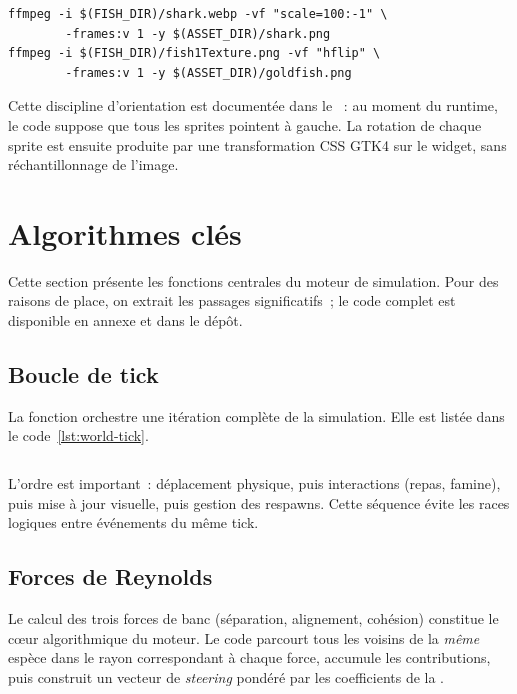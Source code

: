 \begin{verbatim}
ffmpeg -i $(FISH_DIR)/shark.webp -vf "scale=100:-1" \
        -frames:v 1 -y $(ASSET_DIR)/shark.png
ffmpeg -i $(FISH_DIR)/fish1Texture.png -vf "hflip" \
        -frames:v 1 -y $(ASSET_DIR)/goldfish.png
\end{verbatim}

Cette discipline d'orientation est documentée dans le
~: au moment du runtime, le code suppose que tous
les sprites pointent à gauche. La rotation de chaque sprite est
ensuite produite par une transformation CSS GTK4 sur le widget,
sans réchantillonnage de l'image.

\section{Algorithmes clés}

Cette section présente les fonctions centrales du moteur de
simulation. Pour des raisons de place, on extrait les passages
significatifs~; le code complet est disponible en annexe et dans
le dépôt.

\subsection{Boucle de tick}

La fonction  orchestre une itération complète
de la simulation. Elle est listée dans le code~\ref{lst:world-tick}.

\begin{listing}[h!]
\inputminted[firstline=298, lastline=313]{c}{../src/world.c}
\caption{La fonction  (extrait de ).}
\label{lst:world-tick}
\end{listing}

L'ordre est important~: déplacement physique, puis interactions
(repas, famine), puis mise à jour visuelle, puis gestion des
respawns. Cette séquence évite les races logiques entre événements
du même tick.

\subsection{Forces de Reynolds}

Le calcul des trois forces de banc (séparation, alignement,
cohésion) constitue le cœur algorithmique du moteur. Le code
parcourt tous les voisins de la \emph{même} espèce dans le rayon
correspondant à chaque force, accumule les contributions, puis
construit un vecteur de \emph{steering} pondéré par les coefficients
de la \struct{SpeciesConfig}.

